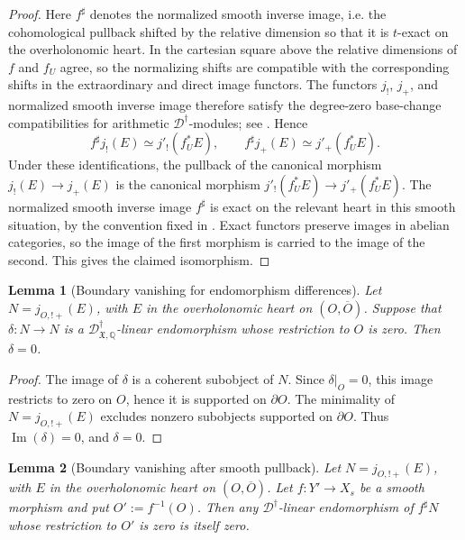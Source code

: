 \documentclass[11pt]{amsart}
\theoremstyle{plain}
\newtheorem{lemma}{Lemma}[section]
\theoremstyle{definition}
\theoremstyle{remark}
\begin{document}
\begin{proof}
Here \(f^\sharp\) denotes the normalized smooth inverse image, i.e. the
cohomological pullback shifted by the relative dimension so that it is
\(t\)-exact on the overholonomic heart. In the cartesian square above the
relative dimensions of \(f\) and \(f_U\) agree, so the normalizing shifts are
compatible with the corresponding shifts in the extraordinary and direct image
functors. The functors \(j_!\), \(j_+\), and normalized smooth inverse image
therefore satisfy the degree-zero base-change compatibilities for arithmetic
\(\mathscr D^\dagger\)-modules; see \cite[\S2.1, Lemmas 2.1.1--2.1.2, and
\S2.2]{HuygheSchmidtIntermediate}. Hence
\[
  f^\sharp j_!(E)\simeq j'_!(f_U^*E),
  \qquad
  f^\sharp j_+(E)\simeq j'_+(f_U^*E).
\]
Under these identifications, the pullback of the canonical morphism
\(j_!(E)\to j_+(E)\) is the canonical morphism
\(j'_!(f_U^*E)\to j'_+(f_U^*E)\). The normalized smooth inverse image
\(f^\sharp\) is exact on the relevant heart in this smooth situation, by the
convention fixed in . Exact functors preserve
images in abelian categories, so the image of the first morphism is carried to
the image of the second. This gives the claimed isomorphism.
\end{proof}

\begin{lemma}[Boundary vanishing for endomorphism differences]
\label{lem:boundary-vanishing-endomorphism-difference}
Let \(N=j_{O,!+}(E)\), with \(E\) in the overholonomic heart on
\((O,\overline O)\). Suppose that \(\delta:N\to N\) is a
\(\mathscr D^\dagger_{\mathfrak X,\mathbb Q}\)-linear endomorphism whose
restriction to \(O\) is zero. Then \(\delta=0\).
\end{lemma}

\begin{proof}
The image of \(\delta\) is a coherent subobject of \(N\). Since \(\delta|_O=0\),
this image restricts to zero on \(O\), hence it is supported on
\(\partial O\). The minimality of \(N=j_{O,!+}(E)\) excludes nonzero subobjects
supported on \(\partial O\). Thus \(\operatorname{Im}(\delta)=0\), and
\(\delta=0\).
\end{proof}

\begin{lemma}[Boundary vanishing after smooth pullback]
\label{lem:boundary-vanishing-smooth-pullback}
Let \(N=j_{O,!+}(E)\), with \(E\) in the overholonomic heart on
\((O,\overline O)\). Let \(f:Y'\to X_s\) be a smooth morphism and put
\(O':=f^{-1}(O)\). Then any
\(\mathscr D^\dagger\)-linear endomorphism of \(f^\sharp N\) whose restriction
to \(O'\) is zero is itself zero.
\end{lemma}
\end{document}
